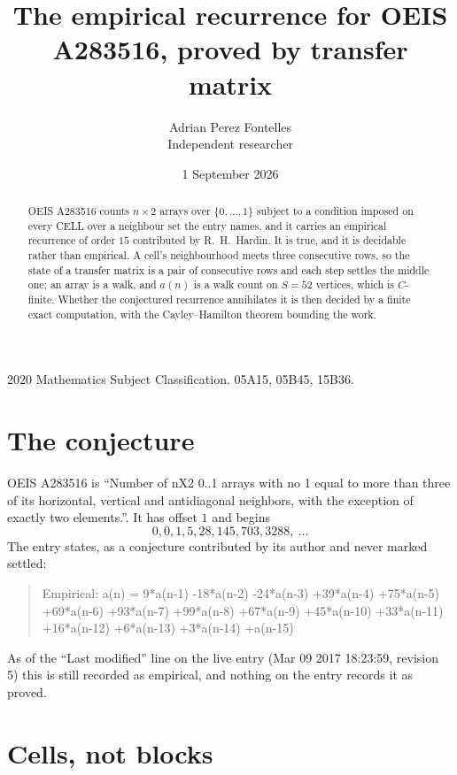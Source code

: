 \documentclass[11pt,a4paper]{article}
\title{The empirical recurrence for OEIS A283516, proved by transfer matrix}
\author{Adrian Perez Fontelles\\ \small Independent researcher}
\date{1 September 2026}
\theoremstyle{plain}
\theoremstyle{definition}
\begin{document}
\maketitle

\begin{abstract}
OEIS A283516 counts $n\times2$ arrays over $\{0,\dots,1\}$ subject to a condition imposed on
every CELL over a neighbour set the entry names, and it carries an empirical recurrence of
order $15$ contributed by R.~H.~Hardin. It is true, and it is decidable rather than
empirical. A cell's neighbourhood meets three consecutive rows, so the state of a transfer
matrix is a pair of consecutive rows and each step settles the middle one; an array is a
walk, and $a(n)$ is a walk count on $S=52$ vertices, which is $C$-finite. Whether the
conjectured recurrence annihilates it is then decided by a finite exact computation, with the
Cayley--Hamilton theorem bounding the work.
\end{abstract}

\noindent\small 2020 Mathematics Subject Classification. 05A15, 05B45, 15B36.\normalsize

\section{The conjecture}

OEIS A283516 is ``Number of nX2 0..1 arrays with no 1 equal to more than three of its horizontal, vertical and antidiagonal neighbors, with the exception of exactly two elements.''. It has offset $1$ and begins
\[
0, 0, 1, 5, 28, 145, 703, 3288,\ \dots
\]
The entry states, as a conjecture contributed by its author and never marked settled:
\begin{quote}
Empirical: a(n) = 9*a(n-1) -18*a(n-2) -24*a(n-3) +39*a(n-4) +75*a(n-5) +69*a(n-6) +93*a(n-7) +99*a(n-8) +67*a(n-9) +45*a(n-10) +33*a(n-11) +16*a(n-12) +6*a(n-13) +3*a(n-14) +a(n-15)
\end{quote}
As of the ``Last modified'' line on the live entry (Mar 09 2017 18:23:59, revision 5) this is still
recorded as empirical, and nothing on the entry records it as proved.

\section{Cells, not blocks}
\end{document}
